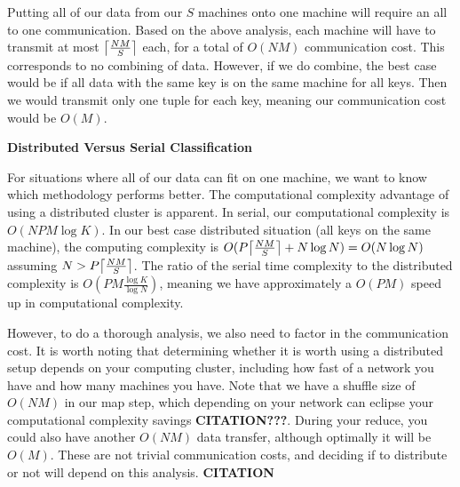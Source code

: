 \vspace{5 mm}
\noindent
Putting all of our data from our $S$ machines onto one machine will require an 
all to one communication. Based on the above analysis, each machine will have 
to transmit at most $\ceil*{\frac{N M}{S}}$ each, for a total of $O(N M)$ 
communication cost. This corresponds to no combining of data. However, if we do 
combine, the best case would be if all data with the same key is on the same 
machine for all keys. Then we would transmit only one tuple for each key, 
meaning our communication cost would be $O(M)$.

\vspace{5 mm}
\noindent
\textbf{Distributed Versus Serial Classification}

\vspace{5 mm}
\noindent
For situations where all of our data can fit on one machine, we want to know 
which methodology performs better. The computational complexity advantage of 
using a distributed cluster is apparent. In serial, our computational 
complexity is $O(N P M \log K)$. In our best case distributed situation (all 
keys on the same machine), the computing complexity is 
$O(P \ceil*{\frac{N M}{S}} + N \log N) = O(N \log N)$ assuming 
$N > P \ceil*{\frac{N M}{S}}$. The ratio of the serial time complexity to the 
distributed complexity is $O(P M \frac{\log K}{\log N})$, meaning we have 
approximately a $O(P M)$ speed up in computational complexity.

\vspace{5 mm}
\noindent
However, to do a thorough analysis, we also need to factor in the communication 
cost. It is worth noting that determining whether it is worth using a 
distributed setup depends on your computing cluster, including how fast of a 
network you have and how many machines you have. Note that we have a shuffle 
size of $O(N M)$ in our map step, which depending on your network can 
eclipse your computational complexity savings \textbf{CITATION???}. During your 
reduce, you could also have another $O(N M)$ data transfer, although optimally 
it will be $O(M)$. These are not trivial communication costs, and deciding if 
to distribute or not will depend on this analysis. \textbf{CITATION}
